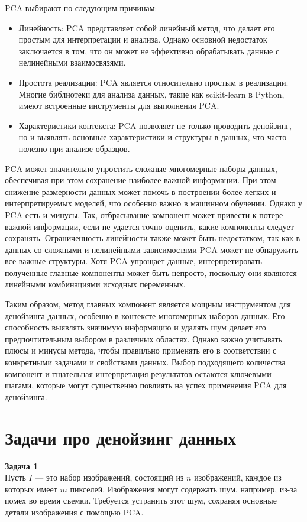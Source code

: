 PCA выбирают по следующим причинам:
\begin{itemize}
\item Линейность: PCA представляет собой линейный метод, что делает его простым для интерпретации и анализа. Однако основной недостаток заключается в том, что он может не эффективно обрабатывать данные с нелинейными взаимосвязями.

\item Простота реализации: PCA является относительно простым в реализации. Многие библиотеки для анализа данных, такие как scikit-learn в Python, имеют встроенные инструменты для выполнения PCA.

\item Характеристики контекста: PCA позволяет не только проводить денойзинг, но и выявлять основные характеристики и структуры в данных, что часто полезно при анализе образцов.
\end{itemize}

PCA может значительно упростить сложные многомерные наборы данных, обеспечивая при этом сохранение наиболее важной информации. При этом снижение размерности данных может помочь в построении более легких и интерпретируемых моделей, что особенно важно в машинном обучении.
Однако у PCA есть и минусы. Так, отбрасывание компонент может привести к потере важной информации, если не удается точно оценить, какие компоненты следует сохранять. Ограниченность линейности также может быть недостатком, так как в данных со сложными и нелинейными зависимостями PCA может не обнаружить все важные структуры. Хотя PCA упрощает данные, интерпретировать полученные главные компоненты может быть непросто, поскольку они являются линейными комбинациями исходных переменных.

Таким образом, метод главных компонент является мощным инструментом для денойзинга данных, особенно в контексте многомерных наборов данных. Его способность выявлять значимую информацию и удалять шум делает его предпочтительным выбором в различных областях. Однако важно учитывать плюсы и минусы метода, чтобы правильно применять его в соответствии с конкретными задачами и свойствами данных. Выбор подходящего количества компонент и тщательная интерпретация результатов остаются ключевыми шагами, которые могут существенно повлиять на успех применения PCA для денойзинга.

\section{Задачи про денойзинг данных}
\textbf{Задача 1}\\
Пусть \( I \) — это набор изображений, состоящий из \( n \) изображений, каждое из которых имеет \( m \) пикселей. Изображения могут содержать шум, например, из-за помех во время съемки. Требуется устранить этот шум, сохраняя основные детали изображения с помощью PCA.

